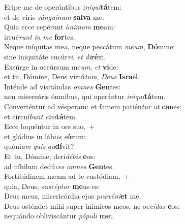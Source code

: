 \evenverse Eripe me de operántibus i\textit{ni}\textit{qui}\textbf{tá}tem:~\*\\
\evenverse et de viris \textit{sán}\textit{gui}\textit{num} \textbf{sal}\textbf{va} me.\\
\oddverse Quia ecce cepérunt á\textit{ni}\textit{mam} \textbf{me}am:~\*\\
\oddverse irrué\textit{runt} \textit{in} \textit{me} \textbf{for}tes.\\
\evenverse Neque iníquitas mea, neque peccátum \textit{me}\textit{um}, \textbf{Dó}mine:~\*\\
\evenverse sine iniquitáte cucúr\textit{ri}, \textit{et} \textit{di}\textbf{ré}xi.\\
\oddverse Exsúrge in occúrsum me\textit{um}, \textit{et} \textbf{vi}de:~\*\\
\oddverse et tu, Dómine, Deus virtú\textit{tum}, \textit{De}\textit{us} \textbf{Is}\textbf{ra}ël.\\
\evenverse Inténde ad visitándas \textit{om}\textit{nes} \textbf{Gen}tes:~\*\\
\evenverse non misereáris ómnibus, qui operántur \textit{i}\textit{ni}\textit{qui}\textbf{tá}tem.\\
\oddverse Converténtur ad vésperam: et famem patién\textit{tur} \textit{ut} \textbf{ca}nes:~\*\\
\oddverse et circuí\textit{bunt} \textit{ci}\textit{vi}\textbf{tá}tem.\\
\evenverse Ecce loquéntur in ore suo,~+\\
\evenverse  et gládius in lábi\textit{is} \textit{e}\textbf{ó}rum:~\*\\
\evenverse quóni\textit{am} \textit{quis} \textit{au}\textbf{dí}vit?\\
\oddverse Et tu, Dómine, deri\textit{dé}\textit{bis} \textbf{e}os:~\*\\
\oddverse ad níhilum dedú\textit{ces} \textit{om}\textit{nes} \textbf{Gen}tes.\\
\evenverse Fortitúdinem meam ad te custódiam,~+\\
\evenverse  quia, Deus, su\textit{scép}\textit{tor} \textbf{me}us es:~\*\\
\evenverse Deus meus, misericórdia ejus \textit{præ}\textit{vé}\textit{ni}\textbf{et} me.\\
\oddverse Deus osténdet mihi super inimícos meos, ne oc\textit{cí}\textit{das} \textbf{e}os:~\*\\
\oddverse nequándo obliviscántur \textit{pó}\textit{pu}\textit{li} \textbf{me}i.\\

